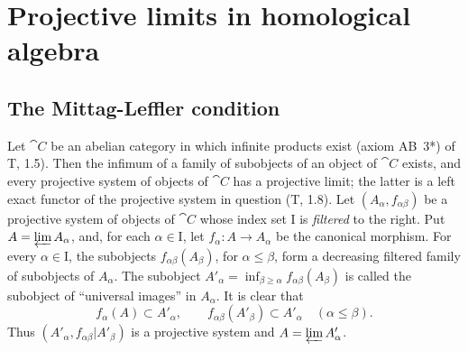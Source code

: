 \section{Projective limits in homological algebra}
\label{section:0.13}

\subsection{The Mittag-Leffler condition}
\label{subsection:0.13.1}

\begin{env}[13.1.1]
\label{0.13.1.1}
Let $\cat{C}$ be an abelian category in which infinite products exist
(axiom AB~3*) of T, 1.5).
Then the infimum of a family of subobjects of an object of $\cat{C}$
exists, and every projective system of objects of $\cat{C}$ has a
projective limit; the latter is a left exact functor of the projective
system in question (T, 1.8).
Let $(A_\alpha,f_{\alpha\beta})$ be a projective system of objects of
$\cat{C}$ whose index set $\mathrm{I}$ is \emph{filtered} to the right.
Put $A=\varprojlim A_\alpha$,
and, for each $\alpha\in\mathrm{I}$, let
$f_\alpha:A\longrightarrow A_\alpha$ be the canonical morphism.
For every $\alpha\in\mathrm{I}$, the subobjects
$f_{\alpha\beta}(A_\beta)$, for $\alpha\leq\beta$, form a decreasing
filtered family of subobjects of $A_\alpha$.
The subobject $A'_\alpha=\inf_{\beta\geq\alpha}f_{\alpha\beta}(A_\beta)$
is called the subobject of ``universal images'' in $A_\alpha$.
It is clear that
\[
  f_\alpha(A)\subset A'_\alpha,
  \qquad
  f_{\alpha\beta}(A'_\beta)\subset A'_\alpha
  \quad(\alpha\leq\beta).
\]
Thus
$(A'_\alpha,f_{\alpha\beta}|A'_\beta)$ is a projective system and $A=\varprojlim A'_\alpha$.
\end{env}

